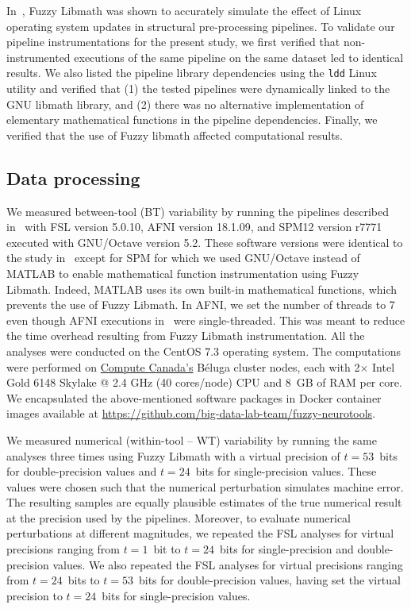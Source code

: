 \documentclass[conference]{IEEEtran}
\begin{document}
In~\cite{salari2021accurate}, Fuzzy Libmath was shown to accurately
simulate the effect of Linux operating system updates in structural
pre-processing pipelines. To validate our pipeline instrumentations for the present study, we first verified that non-instrumented
executions of the same pipeline on the same dataset led to identical
results. We also listed the pipeline
library dependencies using the \texttt{ldd} Linux utility and verified that
(1) the tested pipelines were dynamically linked to the GNU libmath library, and 
(2) there was no alternative implementation of elementary mathematical functions in the pipeline dependencies.
Finally, we verified that the use of Fuzzy libmath affected computational results.

\subsection{Data processing}

We measured between-tool (BT) variability by running the pipelines
described in~\cite{bowring2019exploring} with FSL version 5.0.10, AFNI
version 18.1.09, and SPM12 version r7771 executed with GNU/Octave version
5.2. These software versions were identical to the study
in~\cite{bowring2019exploring} except for SPM for which we used GNU/Octave
instead of MATLAB to enable mathematical function instrumentation using
Fuzzy Libmath. Indeed, MATLAB uses its own built-in mathematical functions,
which prevents the use of Fuzzy Libmath. In AFNI, we set the number of
threads to 7 even though AFNI executions
in~\cite{bowring2019exploring} were single-threaded. This was meant to
reduce the time overhead resulting from Fuzzy Libmath instrumentation. All
the analyses were conducted on the CentOS 7.3 operating system. The
computations were performed on \href{https://www.computecanada.ca}{Compute
Canada's} Béluga cluster nodes, each with 2$\times$ Intel Gold 6148 Skylake
@ 2.4 GHz (40 cores/node) CPU and 8~GB of RAM per core. We encapsulated the
above-mentioned software packages in Docker container images available at
\url{https://github.com/big-data-lab-team/fuzzy-neurotools}.

We measured numerical (within-tool -- WT) variability by running the same analyses three
times using Fuzzy Libmath with a virtual precision of $t=53$~bits for
double-precision values and $t=24$~bits for single-precision values. These
values were chosen such that the numerical perturbation simulates machine
error. The resulting samples are equally plausible estimates of
the true numerical result at the precision used by the pipelines. Moreover, to evaluate numerical perturbations at different magnitudes, 
we repeated the FSL analyses for virtual
precisions ranging from $t=1$~bit to $t=24$~bits for single-precision
and double-precision values. We also repeated the FSL analyses for virtual 
precisions ranging from $t=24$~bits to $t=53$~bits for double-precision values, having 
set the virtual precision to $t=24$~bits for single-precision values. 
\end{document}
